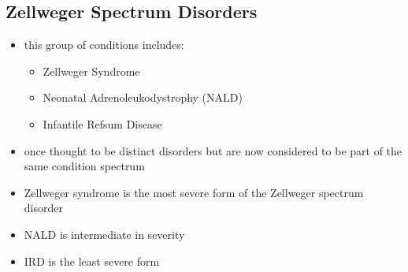 \documentclass{scrartcl}
\begin{document}
\subsection{Zellweger Spectrum Disorders}
\label{sec:org615167d}
\begin{itemize}
\item this group of conditions includes:
\begin{itemize}
\item Zellweger Syndrome
\item Neonatal Adrenoleukodystrophy (NALD)
\item Infantile Refsum Disease
\end{itemize}
\item once thought to be distinct disorders but are now considered to be
part of the same condition spectrum
\item Zellweger syndrome is the most severe form of the Zellweger spectrum disorder
\item NALD is intermediate in severity
\item IRD is the least severe form
\end{itemize}
\end{document}
